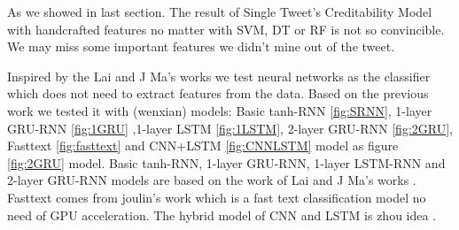 As we showed in last section. The result of Single Tweet's Creditability Model with handcrafted features no matter with SVM, DT or RF is not so convincible. We may miss some important features we didn't mine out of the tweet. 

 Inspired by the Lai and J Ma's works \cite{lai2015recurrent} \cite{madetecting} we test neural networks as the classifier which does not need to extract features from the data.
Based on the previous work we tested it with (wenxian) models: Basic tanh-RNN \ref{fig:SRNN}, 1-layer GRU-RNN \ref{fig:1GRU} ,1-layer LSTM \ref{fig:1LSTM}, 2-layer GRU-RNN \ref{fig:2GRU}, Fasttext \ref{fig:fasttext} and CNN+LSTM \ref{fig:CNNLSTM}  model  as figure \ref{fig:2GRU} model. Basic tanh-RNN, 1-layer GRU-RNN, 1-layer LSTM-RNN and 2-layer GRU-RNN models are based on the work of Lai and J Ma's works \cite{madetecting} \cite{lai2015recurrent}. Fasttext comes from joulin's work  \cite{joulin2016bag} which is a fast text classification model no need of GPU acceleration. The hybrid model of CNN and LSTM is zhou idea \cite{zhou2015c}. 

